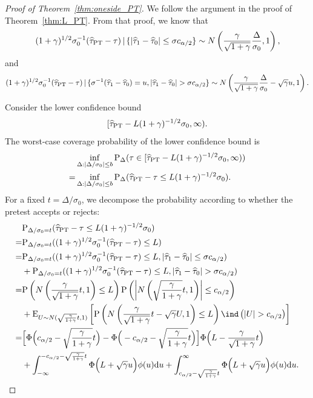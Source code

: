 \documentclass[11pt]{article}
\def\given{\,|\,}
\def\P{{\mathrm P}}
\def\E{{\mathrm E}}
\def\d{{\mathrm d}}
\newcommand{\htau}{\widehat\tau}
\numberwithin{equation}{section}
\theoremstyle{definition}
\begin{document}
\begin{proof}[Proof of Theorem~\ref{thm:oneside_PT}]

We follow the argument in the proof of Theorem~\ref{thm:L_PT}. From that proof, we know that
\begin{align*}
  (1+\gamma)^{1/2} \sigma_0^{-1} (\htau_{\rm PT} - \tau) \given \{\lvert \htau_1 - \htau_0 \rvert \le \sigma c_{\alpha/2}\} \sim N\left(\frac{\gamma}{\sqrt{1+\gamma}} \frac{\Delta}{\sigma_0}, 1\right),
\end{align*}
and
\begin{align*}
  (1+\gamma)^{1/2} \sigma_0^{-1} (\htau_{\rm PT} - \tau) \given \{\sigma^{-1}(\htau_1 - \htau_0) = u, \lvert \htau_1 - \htau_0 \rvert > \sigma c_{\alpha/2}\} \sim N\left(\frac{\gamma}{\sqrt{1+\gamma}} \frac{\Delta}{\sigma_0} - \sqrt{\gamma} u, 1\right).
\end{align*}

Consider the lower confidence bound
\[
  [\htau_{\rm PT} - L (1+\gamma)^{-1/2} \sigma_0, \infty).
\]
The worst-case coverage probability of the lower confidence bound is
\begin{align*}
  & \inf_{\Delta: \lvert \Delta/\sigma_0 \rvert \le b} \P_\Delta(\tau \in [\htau_{\rm PT} - L (1+\gamma)^{-1/2} \sigma_0, \infty))\\
  =& \inf_{\Delta: \lvert \Delta/\sigma_0 \rvert \le b} \P_\Delta(\htau_{\rm PT} - \tau \le L (1+\gamma)^{-1/2} \sigma_0).
\end{align*}
For a fixed $t=\Delta/\sigma_0$, we decompose the probability
according to whether the pretest accepts or rejects:
\begin{align*}
  &\P_{\Delta/\sigma_0 = t}(\htau_{\rm PT} - \tau \le L (1+\gamma)^{-1/2} \sigma_0)\\
  =&\P_{\Delta/\sigma_0 = t}((1+\gamma)^{1/2} \sigma_0^{-1} (\htau_{\rm PT} - \tau) \le L)\\
  =&\P_{\Delta/\sigma_0 = t}((1+\gamma)^{1/2} \sigma_0^{-1} (\htau_{\rm PT} - \tau) \le L, \lvert \htau_1 - \htau_0 \rvert \le \sigma c_{\alpha/2}) \\
  &+ \P_{\Delta/\sigma_0 = t}((1+\gamma)^{1/2} \sigma_0^{-1} (\htau_{\rm PT} - \tau) \le L, \lvert \htau_1 - \htau_0 \rvert > \sigma c_{\alpha/2})\\ 
  =& \P\left( N\left(\frac{\gamma}{\sqrt{1+\gamma}} t, 1\right) \le L \right) \P\left( \left\lvert N\left(\sqrt{\frac{\gamma}{1+\gamma}} t, 1\right) \right\rvert \le c_{\alpha/2} \right)\\
  &+ \E_{U \sim N(\sqrt{\frac{\gamma}{1+\gamma}} t, 1)}\left[\P\left( N\left(\frac{\gamma}{\sqrt{1+\gamma}} t - \sqrt{\gamma} U, 1\right) \le L \right) \ind\left(\lvert U \rvert > c_{\alpha/2}\right)\right]\\
  =& \Big[\Phi\Big(c_{\alpha/2} - \sqrt{\frac{\gamma}{1+\gamma}}t \Big) - \Phi\Big(-c_{\alpha/2} - \sqrt{\frac{\gamma}{1+\gamma}}t \Big)\Big]\Phi\Big(L - \frac{\gamma}{\sqrt{1+\gamma}}t \Big)\\
  &+ \int_{-\infty}^{-c_{\alpha/2} - \sqrt{\frac{\gamma}{1+\gamma}}t} \Phi\Big(L + \sqrt{\gamma} u \Big)\phi(u) \d u + \int_{c_{\alpha/2} - \sqrt{\frac{\gamma}{1+\gamma}}t}^\infty \Phi\Big(L + \sqrt{\gamma} u\Big)\phi(u) \d u.
\end{align*}


\end{proof}
\end{document}
